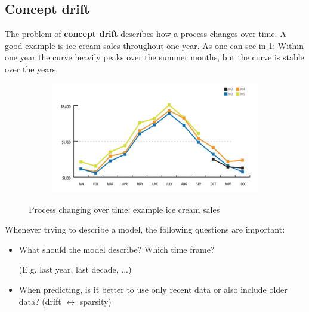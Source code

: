 \subsection{Concept drift}

The problem of \textbf{concept drift} describes how a process changes over time. A good example is ice cream sales throughout one year. As one can see in \ref{fig:7_cd_ice_cream}: Within one year the curve heavily peaks over the summer months, but the curve is stable over the years.

\begin{figure}[H]
  \centering
  \begin{subfigure}{0.5\textwidth}
    \centering
    \includegraphics[width=\textwidth]{assets/sl/cd__ice_cream.png}
  \end{subfigure}

  \caption{Process changing over time: example ice cream sales}
  \label{fig:7_cd_ice_cream}
\end{figure}

Whenever trying to describe a model, the following questions are important:
\begin{itemize}
  \item What should the model describe? Which time frame? \begin{note}(E.g. last year, last decade, ...)\end{note}
  \item When predicting, is it better to use only recent data or also include older data? (drift $\leftrightarrow$ sparsity)
\end{itemize}

